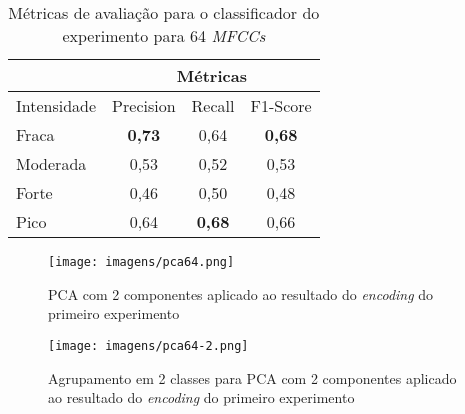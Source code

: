 \begin{table}[h]\caption{\label{table:metricasclf64}Métricas de avaliação para o classificador do experimento para 64 \textit{MFCCs}}
    \centering
    \begin{tabular}{l|ccc|}
        \cline{2-4}
                                      & \multicolumn{3}{c|}{Métricas}                                                               \\ \hline
            \multicolumn{1}{|l|}{Intensidade} & \multicolumn{1}{c|}{Precision}      & \multicolumn{1}{c|}{Recall}           & F1-Score      \\ \hline
            \multicolumn{1}{|l|}{Fraca}       & \multicolumn{1}{c|}{\textbf{0,73}}  & \multicolumn{1}{c|}{0,64}             & \textbf{0,68} \\ \hline
            \multicolumn{1}{|l|}{Moderada}    & \multicolumn{1}{c|}{0,53}           & \multicolumn{1}{c|}{0,52}             & 0,53          \\ \hline
            \multicolumn{1}{|l|}{Forte}       & \multicolumn{1}{c|}{0,46}           & \multicolumn{1}{c|}{0,50}              & 0,48          \\ \hline
            \multicolumn{1}{|l|}{Pico}        & \multicolumn{1}{c|}{0,64}           & \multicolumn{1}{c|}{\textbf{0,68}}    & 0,66          \\ \hline
        \end{tabular}
\end{table}

\clearpage

\begin{landscape}
\begin{figure}[h]
    \centering
    \texttt{[image: imagens/pca64.png]}
    \caption{\label{fig:pca64}PCA com 2 componentes aplicado ao resultado do \textit{encoding} do primeiro experimento}
\end{figure}
\end{landscape}

\begin{landscape}
\begin{figure}[h]
    \centering
    \texttt{[image: imagens/pca64-2.png]}
    \caption{\label{fig:pca64-2}Agrupamento em 2 classes para PCA com 2 componentes aplicado ao resultado do \textit{encoding} do primeiro experimento}
\end{figure}
\end{landscape}

\clearpage
